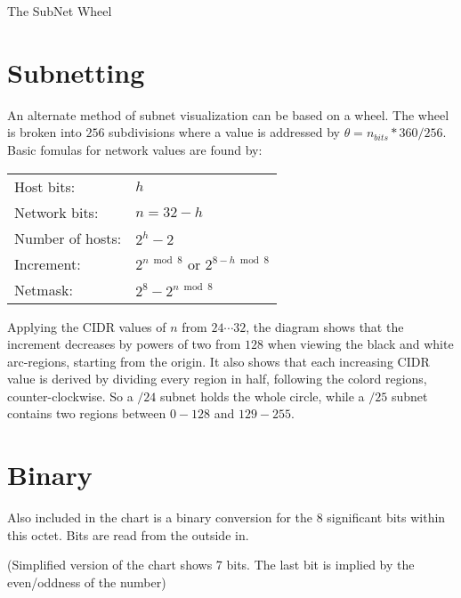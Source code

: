 \documentclass[10pt]{article}
\begin{document}
\thispagestyle{empty}
\begin{center}
  {\Large The SubNet Wheel}\\
\end{center}

\section{Subnetting}

An alternate method of subnet visualization can be based on a wheel. The wheel
is broken into $256$ subdivisions where a value is addressed by
$\theta=n_{bits}*360/256$. Basic fomulas for network values are found by:

\begin{tabular}{ll}
Host bits:   		& $h$\\
Network bits: 		& $n=32-h$\\
Number of hosts: 	& $2^h-2$\\
Increment: 		& $2^{n \bmod 8}$ or $2^{8-h \bmod 8}$\\
Netmask: 		& $2^8-2^{n \bmod 8}$\\
\end{tabular}

Applying the CIDR values of $n$ from $24\cdots32$, the diagram shows that the
increment decreases by powers of two from $128$ when viewing the black and white
arc-regions, starting from the origin. It also shows that each increasing CIDR
value is derived by dividing every region in half, following the colord regions,
counter-clockwise. So a $/24$ subnet holds the whole circle, while a $/25$
subnet contains two regions between $0-128$ and $129-255$.

\section{Binary}

Also included in the chart is a binary conversion for the 8 significant bits
within this octet. Bits are read from the outside in.

(Simplified version of the chart shows 7 bits. The last bit is implied by the
even/oddness of the number)
\end{document}

